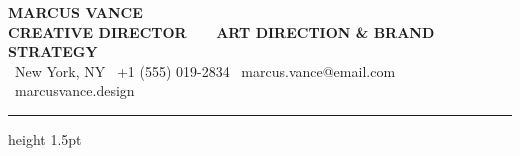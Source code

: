 \documentclass[10pt]{article}
\begin{document}
\begin{minipage}{\textwidth}
  \begin{center}
    {\fontsize{26}{30}\selectfont\color{primary}\textbf{MARCUS VANCE}}\\[0.25em]
    {\fontsize{11}{13}\selectfont\color{accent}\textbf{CREATIVE DIRECTOR \ \textperiodcentered \ \ ART DIRECTION \& BRAND STRATEGY}}\\[0.6em]
    \fontsize{8.5}{10.5}\selectfont\color{secondary}
    \faMapMarker\ New York, NY \quad \textperiodcentered \quad
    \faPhone\ +1 (555) 019-2834 \quad \textperiodcentered \quad
    \faEnvelope\ marcus.vance@email.com \quad \textperiodcentered \quad
    \faGlobe\ marcusvance.design
  \end{center}
\end{minipage}
\vspace{0.8em}
{\color{accent}\hrule height 1.5pt}
\vspace{1.2em}
\end{document}
